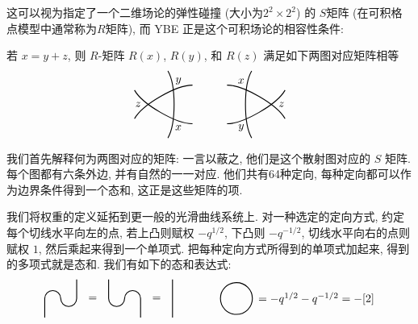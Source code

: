 \documentclass[twoside]{article}
\begin{document}
这可以视为指定了一个二维场论的弹性碰撞 (大小为$2^2\times 2^2$) 的 
$S$矩阵 (在可积格点模型中通常称为$R$矩阵), 
而 YBE 正是这个可积场论的相容性条件: 
\begin{theorem}[Baxter]  
    若 $x = y + z$,  则 $R$-矩阵 $R(x)$, $R(y)$, 
    和 $R(z)$ 满足如下两图对应矩阵相等
    \[
    \begin{tikzpicture}[
        scale = .7,
        thick
    ]
        \begin{scope}[shift={(0,0)}]
            \draw (-85:1.5) .. controls (-60:1) and (60:1) .. (85:1.5);
            \draw (35:1.5) .. controls (60:1) and (180:1) .. (205:1.5);
            \draw (155:1.5) .. controls (180:1) and (-60:1) .. (-35:1.5);
            \node at (-60:1.2) {$x$};
            \node at (60:1.2) {$y$};
            \node at (180:1.2) {$z$};
        \end{scope}
        \begin{scope}[shift={(4,0)}]
            \draw (95:1.5) .. controls (120:1) and (-120:1) .. (-95:1.5);
            \draw (-145:1.5) .. controls (-120:1) and (0:1) .. (25:1.5);
            \draw (-25:1.5) .. controls (0:1) and (120:1) .. (145:1.5);
            \node at (120:1.2) {$x$};
            \node at (-120:1.2) {$y$};
            \node at (0:1.2) {$z$};
        \end{scope}
    \end{tikzpicture}    
\]
\end{theorem}
我们首先解释何为两图对应的矩阵: 
一言以蔽之, 他们是这个散射图对应的 $S$ 矩阵. 
每个图都有六条外边, 并有自然的一一对应. 
他们共有64种定向, 
每种定向都可以作为边界条件得到一个态和, 这正是这些矩阵的项. 

我们将权重的定义延拓到更一般的光滑曲线系统上.
对一种选定的定向方式,
约定每个切线水平向左的点, 
若上凸则赋权 $-q^{1/2}$, 下凸则 $-q^{-1/2}$,
切线水平向右的点则赋权 $1$,
然后乘起来得到一个单项式.
把每种定向方式所得到的单项式加起来, 得到的多项式就是态和.
我们有如下的态和表达式:
\[
    \begin{tikzpicture}[
        scale = .5,
        thick
    ]
        \begin{scope}[shift={(0,0)}]
            \draw (-1, -1.2) -- (-1, 0) arc (180:0:.5) arc (180:360:.5) -- (1, 1.2);
        \end{scope}
        \node at (2, 0) {$=$};
        \begin{scope}[shift={(4,0)}]
            \draw (-1, 1.2) -- (-1, 0) arc (180:360:.5) arc (180:0:.5) -- (1, -1.2);
        \end{scope}
        \node at (6, 0) {$=$};
        \draw (7, 1.2) -- (7, -1.2);

        \draw (11, 0) circle (1);
        \node[inner sep = 0] at (16, 0) {$= -q^{1/2} - q^{-1/2} = -[2]$};
    \end{tikzpicture}  
\]
\end{document}
